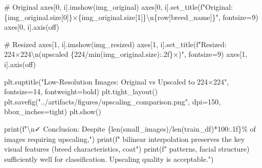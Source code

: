 \documentclass[
  letterpaper,
  DIV=11,
  numbers=noendperiod]{scrartcl}
\newenvironment{Shaded}{\begin{snugshade}}{\end{snugshade}}
\newcommand{\BuiltInTok}[1]{\textcolor[rgb]{0.00,0.23,0.31}{#1}}
\newcommand{\CharTok}[1]{\textcolor[rgb]{0.13,0.47,0.30}{#1}}
\newcommand{\CommentTok}[1]{\textcolor[rgb]{0.37,0.37,0.37}{#1}}
\newcommand{\DecValTok}[1]{\textcolor[rgb]{0.68,0.00,0.00}{#1}}
\newcommand{\NormalTok}[1]{\textcolor[rgb]{0.00,0.23,0.31}{#1}}
\newcommand{\OperatorTok}[1]{\textcolor[rgb]{0.37,0.37,0.37}{#1}}
\newcommand{\SpecialCharTok}[1]{\textcolor[rgb]{0.37,0.37,0.37}{#1}}
\newcommand{\SpecialStringTok}[1]{\textcolor[rgb]{0.13,0.47,0.30}{#1}}
\newcommand{\StringTok}[1]{\textcolor[rgb]{0.13,0.47,0.30}{#1}}
\renewenvironment{Shaded}{%
  \begin{tcolorbox}[%
    enhanced,%
    colback=codebg,%
    colframe=codebg,%
    borderline west={3pt}{0pt}{sectionblue},%
    boxrule=0pt,%
    arc=0pt,%
    boxsep=5pt,%
    left=2mm,%
    right=2mm,%
    top=2mm,%
    bottom=2mm%
  ]%
}{%
  \end{tcolorbox}%
}
\begin{document}
\begin{Shaded}
\begin{Highlighting}[]
    \CommentTok{\# Original}
\NormalTok{    axes[}\DecValTok{0}\NormalTok{, i].imshow(img\_original)}
\NormalTok{    axes[}\DecValTok{0}\NormalTok{, i].set\_title(}\SpecialStringTok{f"Original: }\SpecialCharTok{\{}\NormalTok{img\_original}\SpecialCharTok{.}\NormalTok{size[}\DecValTok{0}\NormalTok{]}\SpecialCharTok{\}}\SpecialStringTok{×}\SpecialCharTok{\{}\NormalTok{img\_original}\SpecialCharTok{.}\NormalTok{size[}\DecValTok{1}\NormalTok{]}\SpecialCharTok{\}}\CharTok{\textbackslash{}n}\SpecialCharTok{\{}\NormalTok{row[}\StringTok{\textquotesingle{}breed\_name\textquotesingle{}}\NormalTok{]}\SpecialCharTok{\}}\SpecialStringTok{"}\NormalTok{, fontsize}\OperatorTok{=}\DecValTok{9}\NormalTok{)}
\NormalTok{    axes[}\DecValTok{0}\NormalTok{, i].axis(}\StringTok{\textquotesingle{}off\textquotesingle{}}\NormalTok{)}
    
    \CommentTok{\# Resized}
\NormalTok{    axes[}\DecValTok{1}\NormalTok{, i].imshow(img\_resized)}
\NormalTok{    axes[}\DecValTok{1}\NormalTok{, i].set\_title(}\SpecialStringTok{f"Resized: 224×224}\CharTok{\textbackslash{}n}\SpecialStringTok{(upscaled }\SpecialCharTok{\{}\DecValTok{224}\OperatorTok{/}\BuiltInTok{min}\NormalTok{(img\_original.size)}\SpecialCharTok{:.2f\}}\SpecialStringTok{×)"}\NormalTok{, fontsize}\OperatorTok{=}\DecValTok{9}\NormalTok{)}
\NormalTok{    axes[}\DecValTok{1}\NormalTok{, i].axis(}\StringTok{\textquotesingle{}off\textquotesingle{}}\NormalTok{)}

\NormalTok{plt.suptitle(}\StringTok{"Low{-}Resolution Images: Original vs Upscaled to 224×224"}\NormalTok{, fontsize}\OperatorTok{=}\DecValTok{14}\NormalTok{, fontweight}\OperatorTok{=}\StringTok{\textquotesingle{}bold\textquotesingle{}}\NormalTok{)}
\NormalTok{plt.tight\_layout()}
\NormalTok{plt.savefig(}\StringTok{"../artifacts/figures/upscaling\_comparison.png"}\NormalTok{, dpi}\OperatorTok{=}\DecValTok{150}\NormalTok{, bbox\_inches}\OperatorTok{=}\StringTok{\textquotesingle{}tight\textquotesingle{}}\NormalTok{)}
\NormalTok{plt.show()}

\BuiltInTok{print}\NormalTok{(}\SpecialStringTok{f"}\CharTok{\textbackslash{}n}\SpecialStringTok{✓ Conclusion: Despite }\SpecialCharTok{\{}\BuiltInTok{len}\NormalTok{(small\_images)}\OperatorTok{/}\BuiltInTok{len}\NormalTok{(train\_df)}\OperatorTok{*}\DecValTok{100}\SpecialCharTok{:.1f\}}\SpecialStringTok{\% of images requiring upscaling,"}\NormalTok{)}
\BuiltInTok{print}\NormalTok{(}\SpecialStringTok{f"  bilinear interpolation preserves the key visual features (breed characteristics, coat"}\NormalTok{)}
\BuiltInTok{print}\NormalTok{(}\SpecialStringTok{f"  patterns, facial structure) sufficiently well for classification. Upscaling quality is acceptable."}\NormalTok{)}
\end{Highlighting}
\end{Shaded}
\end{document}
